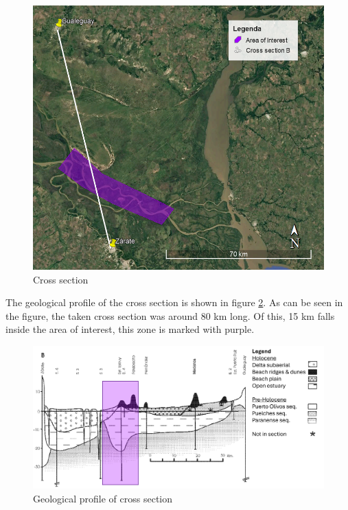 \begin{figure}[H]
    \centering
    \includegraphics[width=0.75\linewidth]{figures/ch9/CrossSectionB.png}
    \caption{Cross section}
    \label{fig:crosssectiongeo}
\end{figure}

The geological profile of the cross section is shown in figure \ref{fig:geolprofile}. As can be seen in the figure, the taken cross section was around 80 km long. Of this, 15 km falls inside the area of interest, this zone is marked with purple.

\begin{figure}[H]
    \centering
    \includegraphics[width=1\linewidth]{figures/ch9/CrossSectionBResults.png}
    \caption{Geological profile of cross section \autocite{cavallottoEvolucionCambiosAmbientales2005}}
    \label{fig:geolprofile}
\end{figure}

